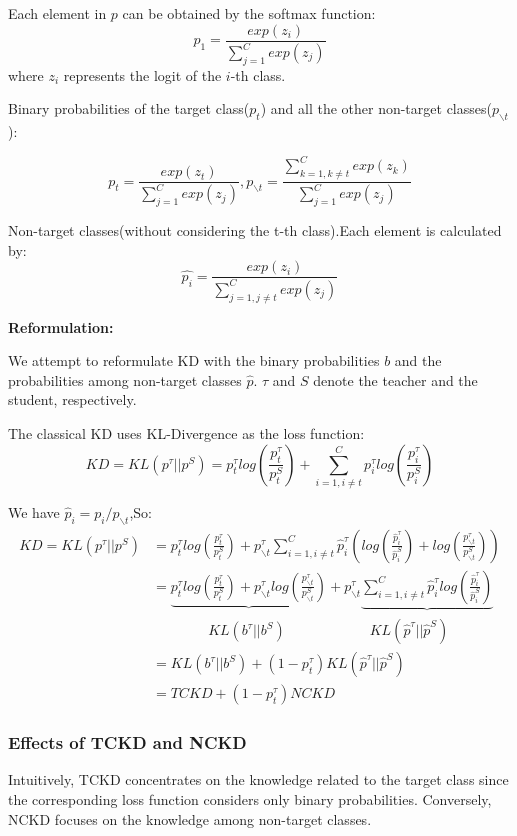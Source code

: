 \documentclass[11pt]{article}
\begin{document}
Each element in $p$ can be obtained by the softmax function:
$$p_1 = \frac{exp(z_i)}{\sum_{j=1}^{C}exp(z_j)}$$
where $z_i$ represents the logit of the $i$-th class.

Binary probabilities of the target class($p_t$) and all the other non-target classes($p_{\backslash t}$):

$$p_t = \frac{exp(z_t)}{\sum_{j=1}^{C}exp(z_j)}, p_{\backslash t} = \frac{\sum_{k=1,k\neq t}^{C}exp(z_k)}{\sum_{j=1}^{C}exp(z_j)}$$

Non-target classes(without considering the t-th class).Each element is calculated by: $$\hat{p_i} = \frac{exp(z_i)}{\sum_{j=1,j\neq t}^{C}exp(z_j)}$$

\textbf{Reformulation:}

We attempt to reformulate KD with the binary probabilities $b$ and the probabilities among non-target classes $\hat{p}$. $\tau$ and $S$ denote the teacher and the student, respectively.

The classical KD uses KL-Divergence as the loss function:
$$KD = KL(p^\tau ||p^S) = p_t^\tau log(\frac{p_t^\tau}{p_t^S}) + \sum_{i=1,i\neq t}^{C}p_i^\tau log(\frac{p_i^\tau}{p_i^S})$$

We have $\hat{p}_i = p_i/p_{\backslash t}$,So:
$$\begin{aligned}
	KD = KL(p^\tau ||p^S) & = p_t^\tau log(\frac{p_t^\tau}{p_t^S}) + p_{\backslash t}^\tau \sum_{i=1,i\neq t}^{C}\hat{p}_i^\tau (log(\frac{\hat{p}_i^\tau}{\hat{p}_i^S}) + log(\frac{p_{\backslash t}^\tau}{p_{\backslash t}^S})) \\
	& = \underbrace{p_t^\tau log(\frac{p_t^\tau}{p_t^S}) + p_{\backslash t}^\tau log(\frac{p_{\backslash t}^\tau}{p_{\backslash t}^S})} + p_{\backslash t}^\tau \underbrace{\sum_{i=1,i\neq t}^{C}\hat{p}_i^\tau log(\frac{\hat{p}_i^\tau}{\hat{p}_i^S})}\\
	& \qquad \qquad KL(b^\tau ||b^S) \qquad \qquad \qquad KL(\hat{p}^\tau ||\hat{p}^S)\\
	& = KL(b^\tau ||b^S) + (1-p_t^\tau)KL(\hat{p}^\tau ||\hat{p}^S)\\
	& = TCKD + (1-p_t^\tau)NCKD
\end{aligned}
$$
\subsubsection{Effects of TCKD and NCKD}
Intuitively, TCKD concentrates on the knowledge related to the target class since the corresponding loss function considers only binary probabilities. Conversely, NCKD focuses on the knowledge among non-target classes.
\end{document}

